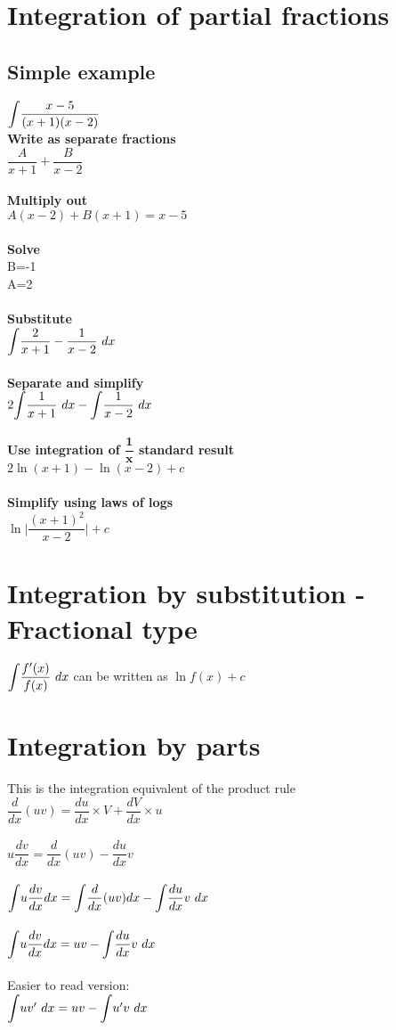 \documentclass{article}[18pt]
\begin{document}
\section{Integration of partial fractions}
\subsection{Simple example}
$\mathlarger{\int}\dfrac{x-5}{(x+1)(x-2)}$\\
\textbf{Write as separate fractions}\\
$\dfrac{A}{x+1}+\dfrac{B}{x-2}$\\
\\
\textbf{Multiply out}\\
$A(x-2)+B(x+1)=x-5$\\
\\
\textbf{Solve}\\
B=-1\\
A=2\\
\\
\textbf{Substitute}\\
$\mathlarger{\int}\dfrac{2}{x+1}-\dfrac{1}{x-2} \ dx$\\
\\
\textbf{Separate and simplify}\\
$2\mathlarger{\int}\dfrac{1}{x+1} \ dx-\mathlarger{\int}\dfrac{1}{x-2} \ dx$\\
\\
\textbf{Use integration of $\mathbf{\dfrac{1}{x}}$ standard result}\\
$2\ln(x+1)-\ln(x-2)+c$\\
\\
\textbf{Simplify using laws of logs}\\
$\ln\Bigg|{\dfrac{(x+1)^2}{x-2}}\Bigg|+c$
\section{Integration by substitution - Fractional type}
$\mathlarger{\int}\dfrac{f'(x)}{f(x)} \ dx$ can be written as $\ln f(x)+c$\\
\section{Integration by parts}
This is the integration equivalent of the product rule\\
$\dfrac{d}{dx}(uv)=\dfrac{du}{dx}\times V+\dfrac{dV}{dx}\times u$\\
\\
$u\dfrac{dv}{dx}=\dfrac{d}{dx}(uv)-\dfrac{du}{dx}v$\\
\\
$\mathlarger{\int}u\dfrac{dv}{dx}dx=\mathlarger{\int}\dfrac{d}{dx}(uv)dx-\mathlarger{\int}\dfrac{du}{dx}v \ dx$\\
\\
$\mathlarger{\int}u\dfrac{dv}{dx}dx=uv-\mathlarger{\int}\dfrac{du}{dx}v \ dx$\\
\\
Easier to read version:\\
$\mathlarger{\int}uv' \ dx=uv-\mathlarger{\int}u'v \ dx$
\newpage
\end{document}
